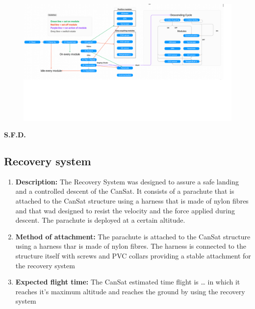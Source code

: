 \documentclass[11pt]{article}
\begin{document}
\begin{enumerate}
\begin{figure}[h]
\includegraphics[width=19cm]{Software Diagram.png}
\centering
\end{figure}
\end{enumerate}
\begin{center}
\vspace{-4.5cm}
\centering
\textbf{S.F.D.}
\end{center}
\subsection{Recovery system}
\begin{enumerate}
\item \textbf{Description:} The Recovery System was designed to assure a safe landing and a controlled descent of the CanSat. It consists of a parachute that is attached to the CanSat structure using a harness that is made of nylon fibres and that wad designed to resist the velocity and the force applied during descent. The parachute is deployed at a certain altitude.
\vspace{0.25cm}
\item \textbf{Method of attachment:} The parachute is attached to the CanSat structure using a harness thar is made of nylon fibres. The harness is connected to the structure itself with screws and PVC collars providing a stable attachment for the recovery system
\vspace{0.25cm}
\item \textbf{Expected flight time:} The CanSat estimated time flight is … in which it reaches it's maximum altitude and reaches the ground by using the recovery system

\end{enumerate}
\end{document}

